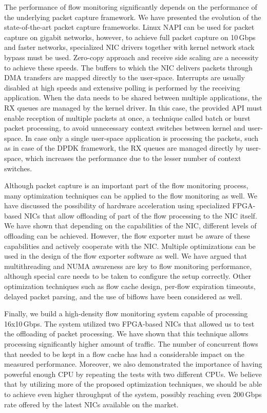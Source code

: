 The performance of flow monitoring significantly depends on the performance of the underlying packet capture framework. We have presented the evolution of the state-of-the-art packet capture frameworks. Linux NAPI can be used for packet capture on gigabit networks, however, to achieve full packet capture on 10\,Gbps and faster networks, specialized NIC drivers together with kernel network stack bypass must be used. Zero-copy approach and receive side scaling are a necessity to achieve these speeds. The buffers to which the NIC delivers packets through DMA transfers are mapped directly to the user-space. Interrupts are usually disabled at high speeds and extensive polling is performed by the receiving application. When the data needs to be shared between multiple applications, the RX queues are managed by the kernel driver. In this case, the provided API must enable reception of multiple packets at once, a technique called batch or burst packet processing, to avoid unnecessary context switches between kernel and user-space. In case only a single user-space application is processing the packets, such as in case of the DPDK framework, the RX queues are managed directly by user-space, which increases the performance due to the lesser number of context switches.

Although packet capture is an important part of the flow monitoring process, many optimization techniques can be applied to the flow monitoring as well. We have discussed the possibility of hardware acceleration using specialized FPGA-based NICs that allow offloading of part of the flow processing to the NIC itself. We have shown that depending on the capabilities of the NIC, different levels of offloading can be achieved. However, the flow exporter must be aware of these capabilities and actively cooperate with the NIC. Multiple optimizations can be used in the design of the flow exporter software as well. We have argued that multithreading and NUMA awareness are key to flow monitoring performance, although special care needs to be taken to configure the setup correctly. Other optimization techniques such as flow cache design, per-flow expiration timeouts, delayed packet parsing, and the use of biflows have been considered as well.

Finally, we build a high-density flow monitoring system capable of processing 16x10\,Gbps. The system utilized two FPGA-based NICs that allowed us to test the offloading of packet processing. We have shown that this technique allows processing significantly higher amount of traffic. The number of concurrent flows that needed to be kept in a flow cache has had a considerable impact on the measured performance. Moreover, we also demonstrated the importance of having powerful enough CPU by repeating the tests with two different CPUs. We believe that by utilizing more of the proposed optimization techniques, we should be able to achieve even higher throughput of the system, possibly reaching even 200\,Gbps rate offered by the latest NICs available on the market.